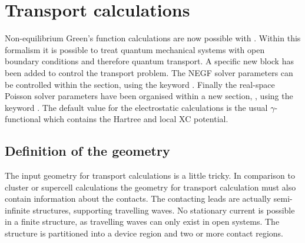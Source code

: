 
\chapter{Transport calculations}
\label{app:transp}

Non-equilibrium Green's function calculations are now possible with
{\dftbp}. Within this formalism it is possible to treat quantum mechanical
systems with open boundary conditions and therefore quantum transport.  A
specific new  block has been added to control the transport
problem.  The NEGF solver parameters can be controlled within the
 section, using the keyword . Finally the
real-space Poisson solver parameters have been organised within a new section,
, using the keyword . The default value for the
electrostatic calculations is the usual $\gamma$-functional which contains the
Hartree and local XC potential.

\section{Definition of the geometry}

The input geometry for transport calculations is a little tricky. In comparison
to cluster or supercell calculations the geometry for transport calculation must
also contain information about the contacts. The contacting leads are actually
semi-infinite structures, supporting travelling waves. No stationary current is
possible in a finite structure, as travelling waves can only exist in open
systems.  The structure is partitioned into a device region and two or more
contact regions.

